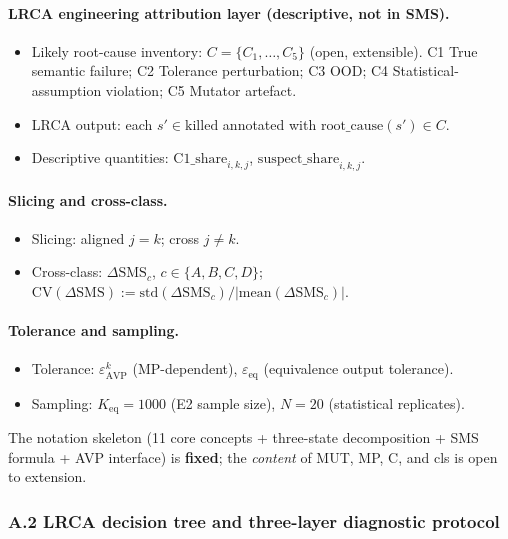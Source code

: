 \documentclass[review,12pt,authoryear]{elsarticle}
\begin{document}
\paragraph{LRCA engineering attribution layer (descriptive, not in SMS).}
\begin{itemize}
\item Likely root-cause inventory: $C = \{C_1, \ldots, C_5\}$ (open, extensible). C1 True semantic failure; C2 Tolerance perturbation; C3 OOD; C4 Statistical-assumption violation; C5 Mutator artefact.
\item LRCA output: each $s' \in \mathrm{killed}$ annotated with $\mathrm{root\_cause}(s') \in C$.
\item Descriptive quantities: $\mathrm{C1\_share}_{i,k,j}$, $\mathrm{suspect\_share}_{i,k,j}$.
\end{itemize}

\paragraph{Slicing and cross-class.}
\begin{itemize}
\item Slicing: aligned $j = k$; cross $j \neq k$.
\item Cross-class: $\Delta\mathrm{SMS}_c$, $c \in \{A, B, C, D\}$; $\mathrm{CV}(\Delta\mathrm{SMS}) := \mathrm{std}(\Delta\mathrm{SMS}_c) / |\mathrm{mean}(\Delta\mathrm{SMS}_c)|$.
\end{itemize}

\paragraph{Tolerance and sampling.}
\begin{itemize}
\item Tolerance: $\varepsilon_{\mathrm{AVP}}^k$ (MP-dependent), $\varepsilon_{\mathrm{eq}}$ (equivalence output tolerance).
\item Sampling: $K_{\mathrm{eq}} = 1000$ (E2 sample size), $N = 20$ (statistical replicates).
\end{itemize}

The notation skeleton (11 core concepts + three-state decomposition +
SMS formula + AVP interface) is \textbf{fixed}; the \emph{content} of
MUT, MP, C, and cls is open to extension.

\subsubsection{A.2 LRCA decision tree and three-layer diagnostic protocol}\label{a.2-lrca-decision-tree-and-three-layer-diagnostic-protocol}
\end{document}
